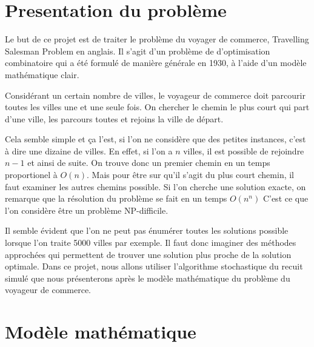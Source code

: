 \documentclass{article}
\begin{document}



\section*{Presentation du problème}

Le but de ce projet est de traiter le problème du voyager de commerce, Travelling Salesman Problem en anglais.
Il s'agit d'un problème de d'optimisation combinatoire qui a été formulé de manière générale en 1930, à l'aide d'un modèle mathématique clair.

Considérant un certain nombre de villes, le voyageur de commerce doit parcourir toutes les villes une et une seule fois.
On chercher le chemin le plus court qui part d'une ville, les parcours toutes et rejoins la ville de départ.

Cela semble simple et ça l'est, si l'on ne considère que des petites instances, c'est à dire une dizaine de villes.
En effet, si l'on a $n$ villes, il est possible de rejoindre $n-1$ et ainsi de suite.
On trouve donc un premier chemin en un temps proportionel à $O(n)$.
Mais pour être sur qu'il s'agit du plus court chemin, il faut examiner les autres chemins possible.
Si l'on cherche une solution exacte, on remarque que la résolution du problème se fait en un temps $O(n^{n})$
C'est ce que l'on considère être un problème NP-difficile.

Il semble évident que l'on ne peut pas énumérer toutes les solutions possible lorsque l'on traite 5000 villes par exemple.
Il faut donc imaginer des méthodes approchées qui permettent de trouver une solution plus proche de la solution optimale.
Dans ce projet, nous allons utiliser l'algorithme stochastique du recuit simulé que nous présenterons après le modèle mathématique du problème du voyageur de commerce.

\section*{Modèle mathématique}
\end{document}
